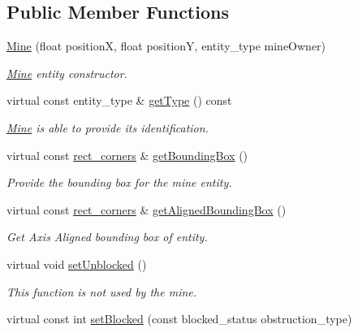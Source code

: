 \subsection*{Public Member Functions}
\begin{DoxyCompactItemize}
\item 
\hyperlink{class_mine_ae3d52389f68d1f458e6240a44cbfd85a}{Mine} (float position\+X, float position\+Y, entity\+\_\+type mine\+Owner)
\begin{DoxyCompactList}\small\item\em \hyperlink{class_mine}{Mine} entity constructor. \end{DoxyCompactList}\item 
\hypertarget{class_mine_af435cf100fe7f89e998ec2f7ad40faa1}{virtual const entity\+\_\+type \& \hyperlink{class_mine_af435cf100fe7f89e998ec2f7ad40faa1}{get\+Type} () const }\label{class_mine_af435cf100fe7f89e998ec2f7ad40faa1}

\begin{DoxyCompactList}\small\item\em \hyperlink{class_mine}{Mine} is able to provide its identification. \end{DoxyCompactList}\item 
\hypertarget{class_mine_a36b2ba160a413d45c9743447f075e99e}{virtual const \hyperlink{structrect__corners}{rect\+\_\+corners} \& \hyperlink{class_mine_a36b2ba160a413d45c9743447f075e99e}{get\+Bounding\+Box} ()}\label{class_mine_a36b2ba160a413d45c9743447f075e99e}

\begin{DoxyCompactList}\small\item\em Provide the bounding box for the mine entity. \end{DoxyCompactList}\item 
\hypertarget{class_mine_a94667c68518d45d9c841501924a83612}{virtual const \hyperlink{structrect__corners}{rect\+\_\+corners} \& \hyperlink{class_mine_a94667c68518d45d9c841501924a83612}{get\+Aligned\+Bounding\+Box} ()}\label{class_mine_a94667c68518d45d9c841501924a83612}

\begin{DoxyCompactList}\small\item\em Get Axis Aligned bounding box of entity. \end{DoxyCompactList}\item 
virtual void \hyperlink{class_mine_a859fd28c2c57a37b22ec3b88806f1134}{set\+Unblocked} ()
\begin{DoxyCompactList}\small\item\em This function is not used by the mine. \end{DoxyCompactList}\item 
\hypertarget{class_mine_acf2add61f1763222f0d1a7333d2b0633}{virtual const int \hyperlink{class_mine_acf2add61f1763222f0d1a7333d2b0633}{set\+Blocked} (const blocked\+\_\+status obstruction\+\_\+type)}\label{class_mine_acf2add61f1763222f0d1a7333d2b0633}


\end{DoxyCompactItemize}
